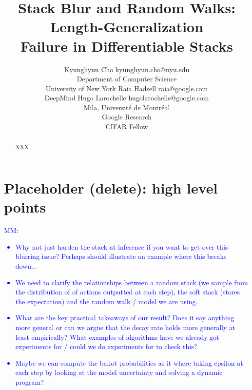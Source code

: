 \documentclass[10pt]{article} %
\title{Stack Blur and Random Walks: Length-Generalization\\ Failure in Differentiable Stacks}
\author{\name Kyunghyun Cho \email kyunghyun.cho@nyu.edu \\
      \addr Department of Computer Science\\
      University of New York
      \AND
      \name Raia Hadsell \email raia@google.com \\
      \addr DeepMind
      \AND
      \name Hugo Larochelle \email hugolarochelle@google.com\\
      \addr Mila, Universit\'e de Montr\'eal \\
      Google Research\\
      CIFAR Fellow}
\newcommand{\mm}[1]{\textcolor{blue}{MM: #1}}
\begin{document}
\maketitle

\begin{abstract}
XXX
\end{abstract}

\section*{Placeholder (delete): high level points}
\mm{
\begin{itemize}
    \item Why not just harden the stack at inference if you want to get over this blurring issue? Perhaps should illustrate an example where this breaks down...
    \item We need to clarify the relationships between a random stack (we sample from the distribution of of actions outputted at each step), the soft stack (stores the expectation) and the random walk / model we are using.
    \item What are the key practical takeaways of our result? Does it say anything more general or can we argue that the decay rate holds more generally at least empirically? What examples of algorithms have we already got experiments for / could we do experiments for to check this?
    \item Maybe we can compute the ballot probabilities as it where taking epsilon at each step by looking at the model uncertainty and solving a dynamic program?
\end{itemize}
}
\end{document}
